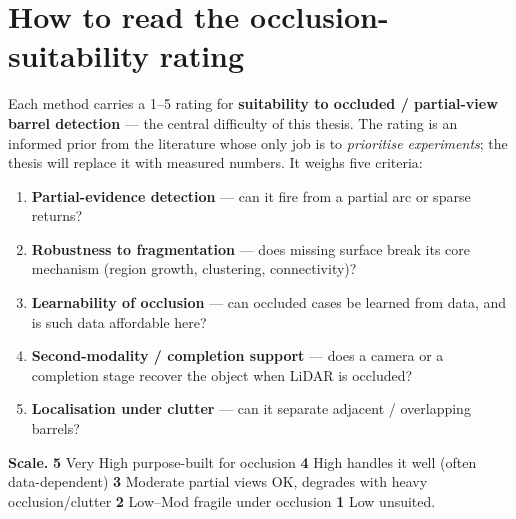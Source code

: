\documentclass[10pt,a4paper]{article}
\begin{document}
\section{How to read the occlusion-suitability rating}

Each method carries a 1--5 rating for \textbf{suitability to occluded / partial-view
barrel detection} --- the central difficulty of this thesis. The rating is an informed
prior from the literature whose only job is to \emph{prioritise experiments}; the thesis
will replace it with measured numbers. It weighs five criteria:

\begin{enumerate}[leftmargin=1.6em,itemsep=1pt,topsep=2pt]
  \item \textbf{Partial-evidence detection} --- can it fire from a partial arc or sparse returns?
  \item \textbf{Robustness to fragmentation} --- does missing surface break its core mechanism (region growth, clustering, connectivity)?
  \item \textbf{Learnability of occlusion} --- can occluded cases be learned from data, and is such data affordable here?
  \item \textbf{Second-modality / completion support} --- does a camera or a completion stage recover the object when LiDAR is occluded?
  \item \textbf{Localisation under clutter} --- can it separate adjacent / overlapping barrels?
\end{enumerate}

\noindent\textbf{Scale.}\quad
\colorbox{cVH}{\textbf{5} Very High} purpose-built for occlusion \;\textbar\;
\colorbox{cH}{\textbf{4} High} handles it well (often data-dependent) \;\textbar\;
\colorbox{cMod}{\textbf{3} Moderate} partial views OK, degrades with heavy occlusion/clutter \;\textbar\;
\colorbox{cLM}{\textbf{2} Low--Mod} fragile under occlusion \;\textbar\;
\colorbox{cLow}{\textbf{1} Low} unsuited.
\end{document}
